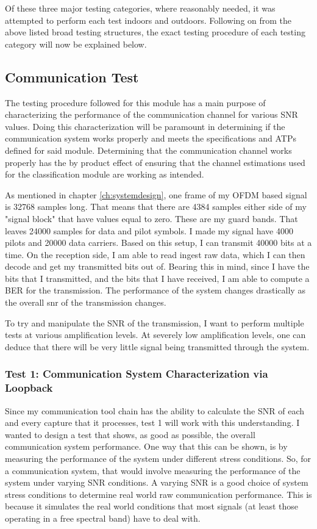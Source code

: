 \documentclass[11pt]{report}
\begin{document}
Of these three major testing categories, where reasonably needed, it was attempted to perform each test indoors and outdoors. Following on from the above listed broad testing structures, the exact testing procedure of each testing category will now be explained below.

\subsection{Communication Test}
The testing procedure followed for this module has a main purpose of characterizing the performance of the communication channel for various SNR values. Doing this characterization will be paramount in determining if the communication system works properly and meets the specifications and ATPs defined for said module. Determining that the communication channel works properly has the by product effect of ensuring that the channel estimations used for the classification module are working as intended.

As mentioned in chapter \ref{ch:systemdesign}, one frame of my OFDM based signal is 32768 samples long. That means that there are 4384 samples either side of my "signal block" that have values equal to zero. These are my guard bands. That leaves 24000 samples for data and pilot symbols. I made my signal have 4000 pilots and 20000 data carriers. Based on this setup, I can transmit 40000 bits at a time. On the reception side, I am able to read ingest raw data, which I can then decode and get my transmitted bits out of. Bearing this in mind, since I have the bits that I transmitted, and the bits that I have received, I am able to compute a BER for the transmission. The performance of the system changes drastically as the overall \gls{snr} of the transmission changes.

To try and manipulate the SNR of the transmission, I want to perform multiple tests at various amplification levels. At severely low amplification levels, one can deduce that there will be very little signal being transmitted through the system.

\subsubsection{Test 1: Communication System Characterization via Loopback}
Since my communication tool chain has the ability to calculate the SNR of each and every capture that it processes, test 1 will work with this understanding. I wanted to design a test that shows, as good as possible, the overall communication system performance. One way that this can be shown, is by measuring the performance of the system under different stress conditions. So, for a communication system, that would involve measuring the performance of the system under varying SNR conditions. A varying SNR is a good choice of system stress conditions to determine real world raw communication performance. This is because it simulates the real world conditions that most signals (at least those operating in a free spectral band) have to deal with.
\end{document}
